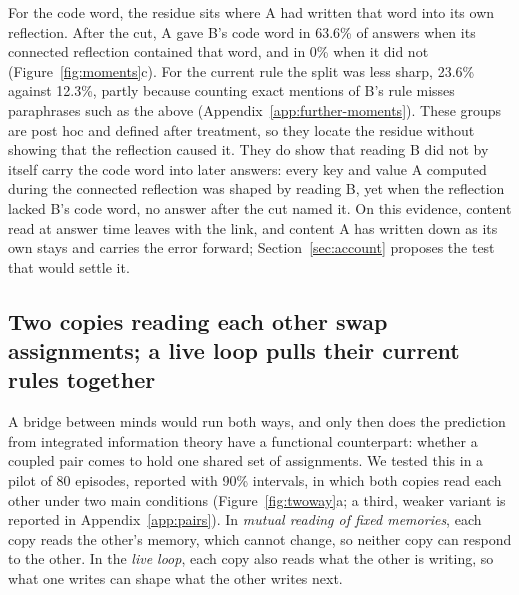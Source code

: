 For the code word, the residue sits where A had written that word into
its own reflection. After the cut, A gave B's code word in 63.6\% of
answers when its connected reflection contained that word, and in 0\%
when it did not (Figure~\ref{fig:moments}c). For the current rule the
split was less sharp, 23.6\% against 12.3\%, partly because counting
exact mentions of B's rule misses paraphrases such as the 
above (Appendix~\ref{app:further-moments}). These groups are post hoc and defined after
treatment, so they locate the residue without showing that the
reflection caused it. They do show that reading B did not by itself carry the code word
into later answers: every key and value A computed during the connected
reflection was shaped by reading B, yet when the reflection lacked B's
code word, no answer after the cut named it. On this evidence, content
read at answer time leaves with the link, and content A has written down
as its own stays and carries the error forward;
Section~\ref{sec:account} proposes the test that would settle it.


\subsection{Two copies reading each other swap assignments; a live loop pulls their current rules together}
\label{sec:twoway}

A bridge between minds would run both ways, and only then does the
prediction from integrated information theory have a functional
counterpart: whether a coupled pair comes to hold one shared set of
assignments. We tested this in a pilot of 80 episodes, reported with
90\% intervals, in which both copies read each other under two main
conditions (Figure~\ref{fig:twoway}a; a third, weaker variant is
reported in Appendix~\ref{app:pairs}). In \emph{mutual reading of fixed
memories}, each copy reads the other's memory, which cannot change, so
neither copy can respond to the other. In the \emph{live loop}, each
copy also reads what the other is writing, so what one writes can shape
what the other writes next.

